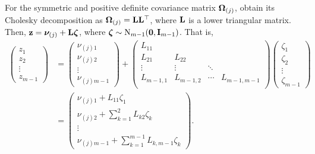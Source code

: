For the symmetric and positive definite covariance matrix ${\bm\Omega}_{(j)}$, obtain its Cholesky decomposition as ${\bm\Omega}_{(j)} = {\mathbf L}{\mathbf L}^\top$, where ${\mathbf L}$ is a lower triangular matrix.
Then, ${\mathbf z} = {\bm\nu}_{(j)} + {\mathbf L}{\bm\zeta}$, where ${\bm\zeta} \sim\operatorname{N}_{m-1}({\mathbf 0},{\mathbf I}_{m-1})$.
That is,
\begin{align*}
  \begin{pmatrix}
    z_1 \\
    z_2 \\
    \vdots \\
    z_{m-1}
  \end{pmatrix}  
  &=
  \begin{pmatrix}
    \nu_{(j)1} \\
    \nu_{(j)2} \\    
    \vdots \\
    \nu_{(j)m-1}
  \end{pmatrix}  
  + 
  \begin{pmatrix}
    L_{11} &       &       & \\
    L_{21} &L_{22} &       & \\
    \vdots &\vdots &\ddots & \\
    L_{m-1,1} &L_{m-1,2} &\cdots &L_{m-1,m-1} \\
  \end{pmatrix} 
  \begin{pmatrix}
    \zeta_1 \\
    \zeta_2 \\    
    \vdots \\
    \zeta_{m-1}
  \end{pmatrix} \\ %
  &=
  \begin{pmatrix}
    \nu_{(j)1} + L_{11}\zeta_1 \\
    \nu_{(j)2} + \sum_{k=1}^2 L_{k2} \zeta_k \\    
    \vdots \\
    \nu_{(j)m-1} + \sum_{k=1}^{m-1} L_{k,m-1} \zeta_k
  \end{pmatrix}.  
\end{align*}

